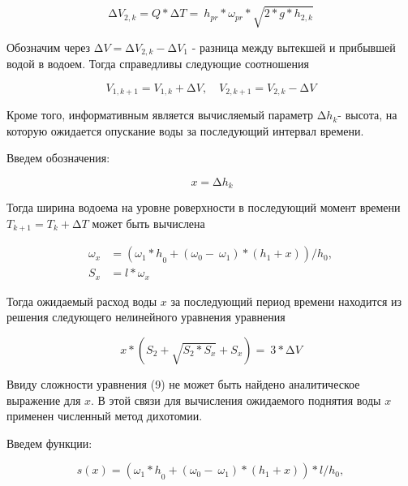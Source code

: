 \begin{multicols}{2}
\begin{equation}
\mathrm{\Delta}V_{2,k} = Q*\mathrm{\Delta}T = \ h_{pr}*\omega_{pr}*\sqrt{2*g*h_{2,k}}
\end{equation}

Обозначим через
\(\mathrm{\Delta}V = \mathrm{\Delta}V_{2,k} - \mathrm{\Delta}V_{1}\) -
разница между вытекшей и прибывшей водой в водоем. Тогда справедливы
следующие соотношения

\begin{equation}
V_{1,k + 1} = V_{1,k} + \mathrm{\Delta}V,\quad V_{2,k + 1} = V_{2,k} - \mathrm{\Delta}V
\end{equation}

Кроме того, информативным является вычисляемый параметр
\({\mathrm{\Delta}h}_{k}\)- высота, на которую ожидается опускание воды
за последующий интервал времени.

Введем обозначения:

\[\ {x = \mathrm{\Delta}h}_{k}\]

Тогда ширина водоема на уровне роверхности в последующий момент времени
\(T_{k + 1} = T_{k} + \mathrm{\Delta}T\) может быть вычислена

\begin{equation}
\begin{aligned}
\omega_{x} &= ({\omega_{1}*h}_{0} + \left( \omega_{0} - \ \omega_{1} \right)*(h_{1} + x))/h_{0}, \\
S_{x} &= l*\omega_{x}
\end{aligned}
\end{equation}

Тогда ожидаемый расход воды \(x\) за последующий период времени
находится из решения следующего нелинейного уравнения уравнения

\begin{equation}
x*\left( S_{2} + \sqrt{S_{2}*S_{x}} + S_{x} \right) = \ 3*\mathrm{\Delta}V
\end{equation}

Ввиду сложности уравнения (9) не может быть найдено аналитическое
выражение для \(x\). В этой связи для вычисления ожидаемого поднятия
воды \(x\ \)применен численный метод дихотомии.
\end{multicols}

Введем функции\(:\)

\begin{equation}
s(x) = \left( {\omega_{1}*h}_{0} + \left( \omega_{0} - \ \omega_{1} \right)*\left( h_{1} + x \right) \right)*l/h_{0},
\end{equation}

